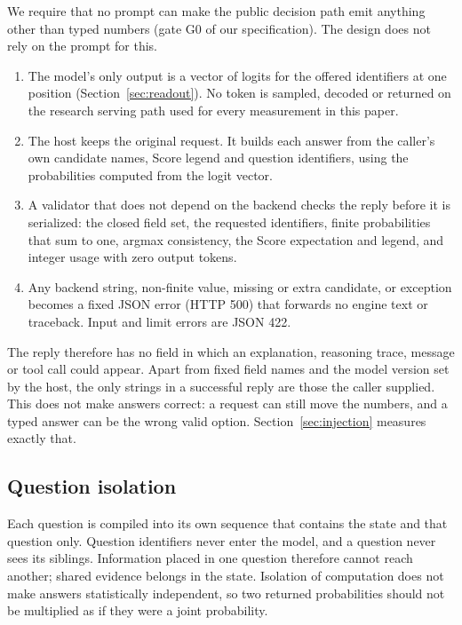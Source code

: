 We require that no prompt can make the public decision path emit anything other than typed
numbers (gate G0 of our specification). The design does not rely on the prompt for this.
\begin{enumerate}
  \item The model's only output is a vector of logits for the offered identifiers at one
    position (Section~\ref{sec:readout}). No token is sampled, decoded or returned on the
    research serving path used for every measurement in this paper.
  \item The host keeps the original request. It builds each answer from the caller's own
    candidate names, Score legend and question identifiers, using the probabilities
    computed from the logit vector.
  \item A validator that does not depend on the backend checks the reply before it is
    serialized: the closed field set, the requested identifiers, finite probabilities that
    sum to one, argmax consistency, the Score expectation and legend, and integer usage with
    zero output tokens.
  \item Any backend string, non-finite value, missing or extra candidate, or exception
    becomes a fixed JSON error (HTTP 500) that forwards no engine text or traceback.
    Input and limit errors are JSON 422.
\end{enumerate}
The reply therefore has no field in which an explanation, reasoning trace, message or tool
call could appear. Apart from fixed field names and the model version set by the host, the
only strings in a successful reply are those the caller supplied.
This does not make answers correct: a request can still move the numbers, and a typed answer
can be the wrong valid option. Section~\ref{sec:injection} measures exactly that.

\subsection{Question isolation}

Each question is compiled into its own sequence that contains the state and that question
only. Question identifiers never enter the model, and a question never sees its siblings.
Information placed in one question therefore cannot reach another; shared evidence belongs
in the state. Isolation of computation does not make answers statistically independent, so
two returned probabilities should not be multiplied as if they were a joint probability.

